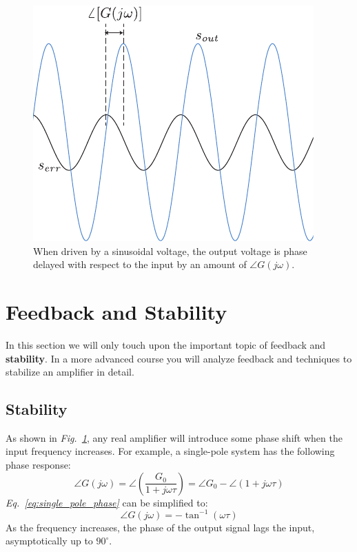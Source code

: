 \newpage
\begin{figure}[t]
\centering
\includegraphics[width=.65\columnwidth]{signal_phase_shift}
\caption{When driven by a sinusoidal voltage, the output voltage is phase delayed with respect to the input by an amount of $\angle G(j\omega)$.}
\label{fig:signal_phase_shift}
\end{figure}
\section{Feedback and Stability}
\label{sec:opamp_stability}
In this section we will only touch upon the important topic of feedback and \textbf{stability}. In a more advanced course you will analyze feedback and techniques to stabilize an amplifier in detail.
\subsection{Stability}
As shown in \emph{Fig.~\ref{fig:signal_phase_shift}}, any real amplifier will introduce some phase shift when the input frequency increases. For example, a single-pole system has the following phase response:
    \begin{equation}
        \angle G(j\omega) = \angle\left(\frac{G_0}{1 + j\omega\tau}\right) = \angle G_0 - \angle (1 + j\omega\tau)
        \label{eq:single_pole_phase}
    \end{equation}
\emph{Eq.~\ref{eq:single_pole_phase}} can be simplified to:
    \begin{equation}
        \angle G(j\omega) = -\tan^{-1}(\omega\tau)
    \end{equation}
As the frequency increases, the phase of the output signal lags the input, asymptotically up to $90^\circ$.
